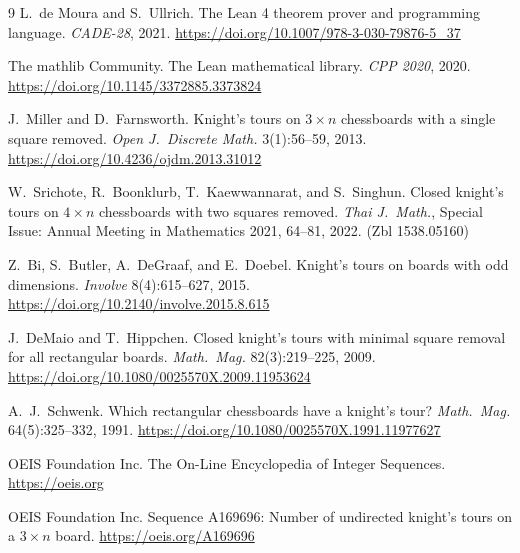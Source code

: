 \documentclass[11pt]{article}
\begin{document}
\begin{thebibliography}{9}
L.~de Moura and S.~Ullrich.
\newblock The Lean 4 theorem prover and programming language.
\newblock \emph{CADE-28}, 2021. \url{https://doi.org/10.1007/978-3-030-79876-5_37}

The mathlib Community.
\newblock The Lean mathematical library.
\newblock \emph{CPP 2020}, 2020. \url{https://doi.org/10.1145/3372885.3373824}

J.~Miller and D.~Farnsworth.
\newblock Knight's tours on $3\times n$ chessboards with a single square
removed.
\newblock \emph{Open J.\ Discrete Math.} 3(1):56--59, 2013.
\url{https://doi.org/10.4236/ojdm.2013.31012}

W.~Srichote, R.~Boonklurb, T.~Kaewwannarat, and S.~Singhun.
\newblock Closed knight's tours on $4\times n$ chessboards with two squares
removed.
\newblock \emph{Thai J.\ Math.}, Special Issue: Annual Meeting in
Mathematics 2021, 64--81, 2022. (Zbl 1538.05160)

Z.~Bi, S.~Butler, A.~DeGraaf, and E.~Doebel.
\newblock Knight's tours on boards with odd dimensions.
\newblock \emph{Involve} 8(4):615--627, 2015.
\url{https://doi.org/10.2140/involve.2015.8.615}

J.~DeMaio and T.~Hippchen.
\newblock Closed knight's tours with minimal square removal for all
rectangular boards.
\newblock \emph{Math.\ Mag.} 82(3):219--225, 2009.
\url{https://doi.org/10.1080/0025570X.2009.11953624}

A.~J.~Schwenk.
\newblock Which rectangular chessboards have a knight's tour?
\newblock \emph{Math.\ Mag.} 64(5):325--332, 1991.
\url{https://doi.org/10.1080/0025570X.1991.11977627}

OEIS Foundation Inc.
\newblock The On-Line Encyclopedia of Integer Sequences.
\newblock \url{https://oeis.org}

OEIS Foundation Inc.
\newblock Sequence A169696: Number of undirected knight's tours on a $3\times n$
board.
\newblock \url{https://oeis.org/A169696}
\end{thebibliography}
\end{document}
